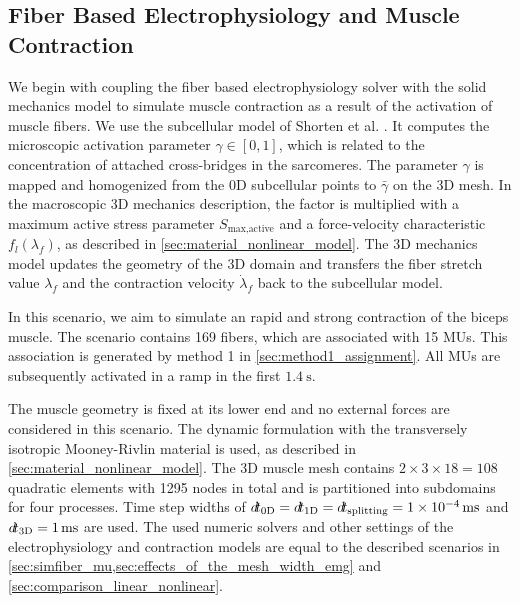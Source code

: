 \subsection{Fiber Based Electrophysiology and Muscle Contraction}\label{sec:fiber_based_contraction}

We begin with coupling the fiber based electrophysiology solver with the solid mechanics model to simulate muscle contraction as a result of the activation of muscle fibers.
We use the subcellular model of Shorten et al. \cite{Shorten2007}. It computes the microscopic activation parameter $\gamma \in [0,1]$, which is related to the concentration of attached cross-bridges in the sarcomeres. The parameter $\gamma$ is mapped and homogenized from the 0D subcellular points to $\bar{\gamma}$ on the 3D mesh. In the macroscopic 3D mechanics description, the factor is multiplied with a maximum active stress parameter $S_\text{max,active}$ and a force-velocity characteristic $f_l(\lambda_f)$, as described in \cref{sec:material_nonlinear_model}.
The 3D mechanics model updates the geometry of the 3D domain and transfers the fiber stretch value $\lambda_f$ and the contraction velocity $\dot{\lambda}_f$ back to the subcellular model.

In this scenario, we aim to simulate an rapid and strong contraction of the biceps muscle.
The scenario contains 169 fibers, which are associated with 15 MUs. This association is generated by method 1 in \cref{sec:method1_assignment}. All MUs are subsequently activated in a ramp in the first $\SI{1.4}{\s}$. 

The muscle geometry is fixed at its lower end and no external forces are considered in this scenario. The dynamic formulation with the transversely isotropic Mooney-Rivlin material is used, as described in \cref{sec:material_nonlinear_model}.
The 3D muscle mesh contains $2 \times 3 \times 18 = 108$ quadratic elements with 1295 nodes in total and is  partitioned into subdomains for four processes. Time step widths of $\dt_\text{0D} = \dt_\text{1D} = \dt_\text{splitting} = \SI{1e-4}{\ms}$ and $\dt_\text{3D}=\SI{1}{\ms}$ are used. The used numeric solvers and other settings of the electrophysiology and contraction models are equal to the described scenarios in \cref{sec:simfiber_mu,sec:effects_of_the_mesh_width_emg} and \cref{sec:comparison_linear_nonlinear}.

